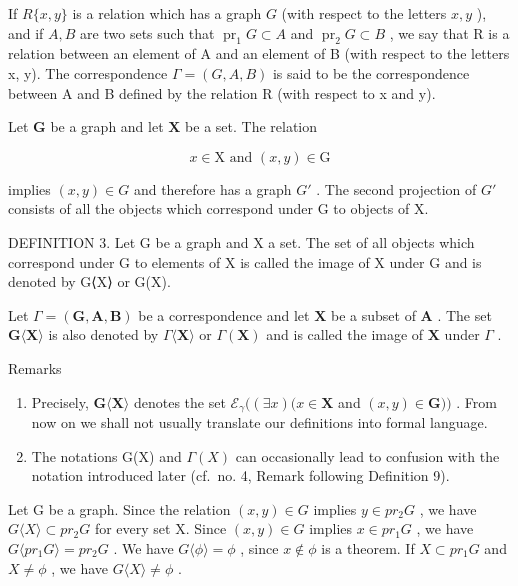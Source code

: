 If \(R\{x, y\}\) is a relation which has a graph \(G\) (with respect to the letters \(x, y\) ), and if \(A, B\) are two sets such that \(\operatorname{pr}_1 G \subset A\) and \(\operatorname{pr}_2 G \subset B\) , we say that R is a relation between an element of A and an element of B (with respect to the letters x, y). The correspondence \(\Gamma = (G, A, B)\) is said to be the correspondence between A and B defined by the relation R (with respect to x and y).

Let \(\mathbf{G}\) be a graph and let \(\mathbf{X}\) be a set. The relation

\[
x \in \mathrm{X} \text {   and   } (x, y) \in \mathrm{G}
\]

implies \((x, y) \in G\) and therefore has a graph \(G'\) . The second projection of \(G'\) consists of all the objects which correspond under G to objects of X.

DEFINITION 3. Let G be a graph and X a set. The set of all objects which correspond under G to elements of X is called the image of X under G and is denoted by G⟨X⟩ or G(X).

Let \(\Gamma = (\mathbf{G},\mathbf{A},\mathbf{B})\) be a correspondence and let \(\mathbf{X}\) be a subset of \(\mathbf{A}\) . The set \(\mathbf{G}\langle \mathbf{X}\rangle\) is also denoted by \(\Gamma \langle \mathbf{X}\rangle\) or \(\Gamma (\mathbf{X})\) and is called the image of \(\mathbf{X}\) under \(\Gamma\) .

Remarks

\begin{enumerate}
\def\labelenumi{(\arabic{enumi})}
\item
  Precisely, \(\mathbf{G}\langle \mathbf{X}\rangle\) denotes the set \(\mathcal{E}_{\gamma}((\exists x)(x\in \mathbf{X}\) and \((x,y)\in \mathbf{G}))\) . From now on we shall not usually translate our definitions into formal language.
\item
  The notations G(X) and \(\Gamma(X)\) can occasionally lead to confusion with the notation introduced later (cf.~no. 4, Remark following Definition 9).
\end{enumerate}

Let G be a graph. Since the relation \((x, y) \in G\) implies \(y \in pr_{2}G\) , we have \(G\langle X \rangle \subset pr_{2}G\) for every set X. Since \((x, y) \in G\) implies \(x \in pr_{1}G\) , we have \(G\langle pr_{1}G \rangle = pr_{2}G\) . We have \(G\langle \phi \rangle = \phi\) , since \(x \notin \phi\) is a theorem. If \(X \subset pr_{1}G\) and \(X \neq \phi\) , we have \(G\langle X \rangle \neq \phi\) .


